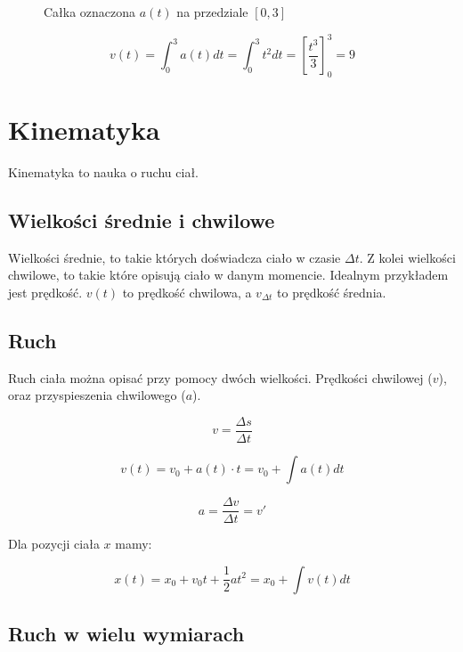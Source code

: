 \documentclass{../notatki}
\begin{document}
\begin{figure*}[ht]
  \centering
  \caption{Całka oznaczona $a(t)$ na przedziale $[0, 3]$}
\end{figure*}

$$
v(t) = \int^3_0 a(t) dt = \int^3_0 t^2 dt = \left[\frac{t^3}{3}\right]^3_0 = 9
$$

\section{Kinematyka}

Kinematyka to nauka o ruchu ciał.

\subsection{Wielkości średnie i chwilowe}

Wielkości średnie, to takie których doświadcza ciało w czasie $\Delta t$.
Z kolei wielkości chwilowe, to takie które opisują ciało w danym momencie.
Idealnym przykładem jest prędkość. $v(t)$ to prędkość chwilowa, a $v_{\Delta t}$
to prędkość średnia.

\subsection{Ruch}

Ruch ciała można opisać przy pomocy dwóch wielkości. Prędkości chwilowej ($v$),
oraz przyspieszenia chwilowego ($a$).

$$
v = \frac{\Delta s}{\Delta t}
$$

$$
v(t) = v_0 + a(t) \cdot t = v_0 + \int a(t) dt
$$

$$
a = \frac{\Delta v}{\Delta t} = v'
$$

Dla pozycji ciała $x$ mamy:

$$
x(t) = x_0 + v_0t + \frac{1}{2}a t^2 = x_0 + \int v(t) dt
$$

\subsection{Ruch w wielu wymiarach}
\end{document}
